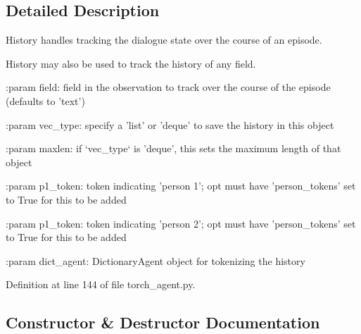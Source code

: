 \subsection{Detailed Description}
\begin{DoxyVerb}History handles tracking the dialogue state over the course of an episode.

History may also be used to track the history of any field.

:param field:
    field in the observation to track over the course of the episode
    (defaults to 'text')

:param vec_type:
    specify a 'list' or 'deque' to save the history in this object

:param maxlen:
    if `vec_type` is 'deque', this sets the maximum length of that object

:param p1_token:
    token indicating 'person 1'; opt must have 'person_tokens' set to True
    for this to be added

:param p1_token:
    token indicating 'person 2'; opt must have 'person_tokens' set to True
    for this to be added

:param dict_agent:
    DictionaryAgent object for tokenizing the history
\end{DoxyVerb}
 

Definition at line 144 of file torch\+\_\+agent.\+py.



\subsection{Constructor \& Destructor Documentation}
\mbox{\label{classparlai_1_1core_1_1torch__agent_1_1History_af2670eff50563dcee5da6581355e758f}} 

